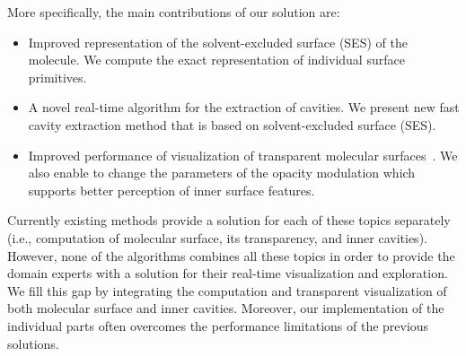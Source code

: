 More specifically, the main contributions of our solution are:
\begin{itemize}
  \item  Improved representation of the solvent-excluded surface (SES) of the molecule. We compute the exact representation of individual surface primitives.
  \item A novel real-time algorithm for the extraction of cavities. We present new fast cavity extraction method that is based on solvent-excluded surface (SES).
  \item Improved performance of visualization of transparent molecular surfaces~\cite{kauker2013rendering}. We also enable to change the parameters of the opacity modulation which supports better perception of inner surface features.
  
\end{itemize}

Currently existing methods provide a solution for each of these topics separately (i.e., computation of molecular surface, its transparency, and inner cavities).
However, none of the algorithms combines all these topics in order to provide the domain experts with a solution for their real-time visualization and exploration.
We fill this gap by integrating the computation and transparent visualization of both molecular surface and inner cavities.
Moreover, our implementation of the individual parts often overcomes the performance limitations of the previous solutions.



